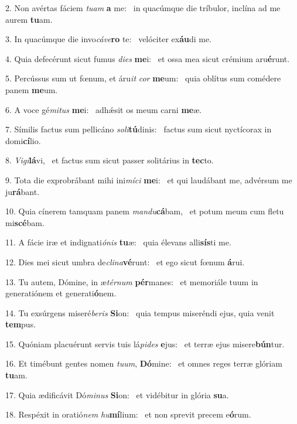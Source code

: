 2. Non avértas fáciem \textit{tu}\textit{am} \textbf{a} me: \ast\  in quacúmque die tríbulor, inclína ad me aurem \textbf{tu}am.\

3. In quacúmque die invo\textit{cá}\textit{ve}\textbf{ro} te: \ast\  velóciter ex\textbf{áu}di me.\

4. Quia defecérunt sicut fumus \textit{di}\textit{es} \textbf{me}i: \ast\  et ossa mea sicut crémium aru\textbf{é}runt.\

5. Percússus sum ut fœnum, et áru\textit{it} \textit{cor} \textbf{me}um: \ast\  quia oblítus sum comédere panem \textbf{me}um.\

6. A voce gé\textit{mi}\textit{tus} \textbf{me}i: \ast\  adhǽsit os meum carni \textbf{me}æ.\

7. Símilis factus sum pellicáno \textit{so}\textit{li}\textbf{tú}dinis: \ast\  factus sum sicut nyctícorax in domi\textbf{cí}lio.\

8. \textit{Vi}\textit{gi}\textbf{lá}vi, \ast\  et factus sum sicut passer solitárius in \textbf{tec}to.\

9. Tota die exprobrábant mihi ini\textit{mí}\textit{ci} \textbf{me}i: \ast\  et qui laudábant me, advérsum me ju\textbf{rá}bant.\

10. Quia cínerem tamquam panem \textit{man}\textit{du}\textbf{cá}bam, \ast\  et potum meum cum fletu mi\textbf{scé}bam.\

11. A fácie iræ et indignati\textit{ó}\textit{nis} \textbf{tu}æ: \ast\  quia élevans alli\textbf{sís}ti me.\

12. Dies mei sicut umbra de\textit{cli}\textit{na}\textbf{vé}runt: \ast\  et ego sicut fœnum \textbf{á}rui.\

13. Tu autem, Dómine, in æ\textit{tér}\textit{num} \textbf{pér}manes: \ast\  et memoriále tuum in generatiónem et generati\textbf{ó}nem.\

14. Tu exsúrgens miseré\textit{be}\textit{ris} \textbf{Si}on: \ast\  quia tempus miseréndi ejus, quia venit \textbf{tem}pus.\

15. Quóniam placuérunt servis tuis lá\textit{pi}\textit{des} \textbf{e}jus: \ast\  et terræ ejus misere\textbf{bún}tur.\

16. Et timébunt gentes nomen \textit{tu}\textit{um}, \textbf{Dó}mine: \ast\  et omnes reges terræ glóriam \textbf{tu}am.\

17. Quia ædificávit Dó\textit{mi}\textit{nus} \textbf{Si}on: \ast\  et vidébitur in glória \textbf{su}a.\

18. Respéxit in oratió\textit{nem} \textit{hu}\textbf{mí}lium: \ast\  et non sprevit precem e\textbf{ó}rum.\

